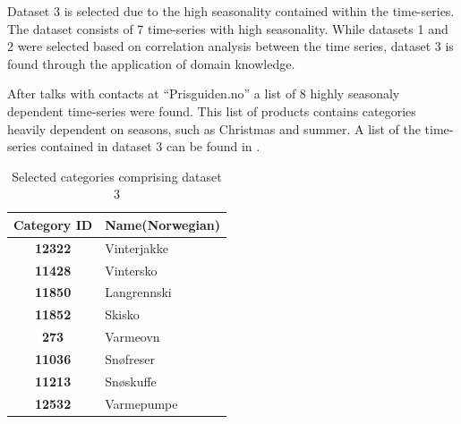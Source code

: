 Dataset 3 is selected due to the high seasonality contained within the time-series.
The dataset consists of 7 time-series with high seasonality.
While datasets 1 and 2 were selected based on correlation analysis between the time series,
dataset 3 is found through the application of domain knowledge.

After talks with contacts at ``Prisguiden.no'' a list of 8 highly seasonaly dependent time-series were found.
This list of products contains categories heavily dependent on seasons, such as Christmas and summer.
A list of the time-series contained in dataset 3 can be found in .


\begin{table}[H]
  \centering
  \caption{Selected categories comprising dataset 3}
  \label{table:dataset3}
  \begin{tabular}{|c|l|}\hline
    Category ID      & Name(Norwegian) \\ \hline
    \textbf{12322  } & Vinterjakke     \\ \hline
    \textbf{11428  } & Vintersko       \\ \hline
    \textbf{11850  } & Langrennski     \\ \hline
    \textbf{11852  } & Skisko          \\ \hline
    \textbf{273    } & Varmeovn        \\ \hline
    \textbf{11036  } & Snøfreser       \\ \hline
    \textbf{11213  } & Snøskuffe       \\ \hline
    \textbf{12532  } & Varmepumpe      \\ \hline
  \end{tabular}
\end{table}


